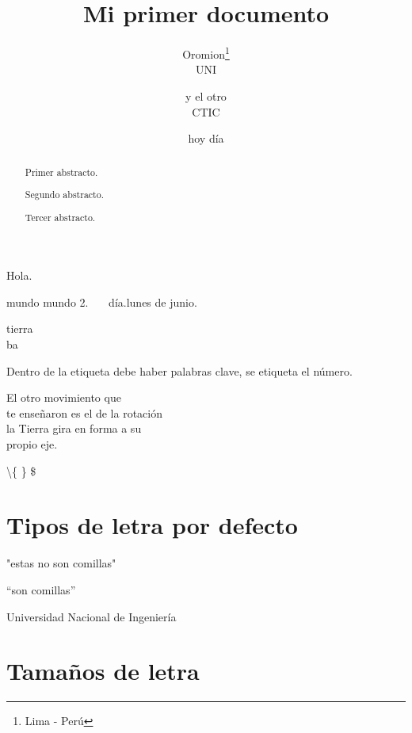 \documentclass{article}
\title{Mi primer documento}
\author{Oromion\thanks{Lima - Perú}\\UNI\and y el otro\\CTIC}
\date{hoy día}
\begin{document}
\maketitle
\thispagestyle{empty}

\begin{abstract}
Primer abstracto.
\end{abstract}

\renewcommand{\abstractname}{Abstract}
\begin{abstract}
Segundo abstracto.
\end{abstract}
\renewcommand{\abstractname}{}

\begin{abstract}
Tercer abstracto.
\end{abstract}

\newpage
\vspace*{4cm}	%
Hola.

\vspace{2cm}	%

\hspace*{3cm} mundo \hspace{4cm} mundo 2. \ \ \ día.\quad lunes de junio.

tierra\\ b\medskip a
\enlargethispage{2mm}
\lipsum[2-4]

Dentro de la etiqueta debe haber palabras clave, se etiqueta el número.

\newpage
\begin{flushright}
El otro movimiento que\\ te enseñaron es el de la rotación\\ la Tierra gira en forma a su\\ propio eje. 
\end{flushright}

\textbackslash \{ \} \$
\section[Letra]{Tipos de letra por defecto}
"estas no son comillas"

``son comillas''


Universidad Nacional de Ingeniería
\section[Tamaño]{Tamaños de letra}\label{sec:2}
\end{document}

